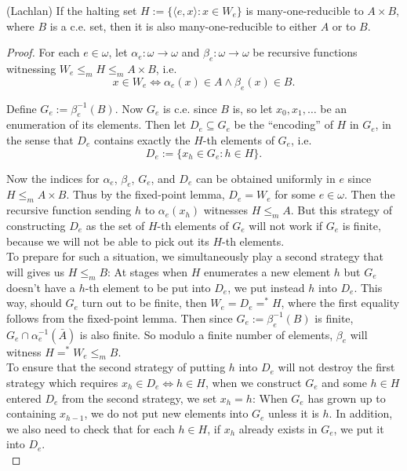 \begin{theorem}
  (Lachlan) If the halting set $H:=\{\langle e,x\rangle: x\in W_e\}$ is
  many-one-reducible to $A\times B$, where $B$ is a c.e. set, then it is
  also many-one-reducible to either $A$ or to $B$.
\end{theorem}
\begin{proof}
  For each $e\in\omega$, let $\alpha_e:\omega \rightarrow\omega$ and
  $\beta_e:\omega \rightarrow\omega$ be recursive functions witnessing
  $W_e\leq_m H\leq_m A\times B$, i.e.
  \[x\in W_e \Leftrightarrow \alpha_e(x)\in A \wedge \beta_e(x)\in B.\]

  Define $G_e:=\beta_e^{-1}(B)$. Now $G_e$ is c.e. since $B$ is, so let
  $x_0,x_1,\ldots$ be an enumeration of its elements. Then let
  $D_e\subseteq G_e$ be the ``encoding'' of $H$ in $G_e$, in the sense that
  $D_e$ contains exactly the $H$-th elements of $G_e$, i.e.
  \[D_e :=\{x_h\in G_e: h\in H\}.\]

  Now the indices for $\alpha_e$, $\beta_e$, $G_e$, and $D_e$ can be
  obtained uniformly in $e$ since $H\leq_m A\times B$. Thus by the
  fixed-point lemma, $D_e=W_e$ for some $e\in\omega$. Then the recursive
  function sending $h$ to $\alpha_e(x_h)$ witnesses $H\leq_m A$. But this
  strategy of constructing $D_e$ as the set of $H$-th elements of $G_e$
  will not work if $G_e$ is finite, because we will not be able to pick out
  its $H$-th elements.\\

  To prepare for such a situation, we simultaneously play a second strategy
  that will gives us $H\leq_m B$: At stages when $H$ enumerates a new
  element $h$ but $G_e$ doesn't have a $h$-th element to be put into
  $D_e$, we put instead $h$ into $D_e$. This way, should $G_e$ turn out to
  be finite, then $W_e=D_e=^*H$, where the first equality follows from the
  fixed-point lemma. Then since $G_e:=\beta_e^{-1}(B)$ is finite,
  $G_e\cap \alpha_e^{-1}(\bar{A})$ is also finite. So modulo a finite
  number of elements, $\beta_e$ will witness $H=^*W_e\leq_m B$.\\

  To ensure that the second strategy of putting $h$ into $D_e$ will not
  destroy the first strategy which requires $x_h\in D_e \Leftrightarrow
  h\in H$, when we construct $G_e$ and some $h\in H$ entered $D_e$ from
  the second strategy, we set $x_h=h$: When $G_e$ has grown up to
  containing $x_{h-1}$, we do not put new elements into $G_e$ unless it is
  $h$. In addition, we also need to check that for each $h\in H$, if $x_h$
  already exists in $G_e$, we put it into $D_e$.\\


\end{proof}
